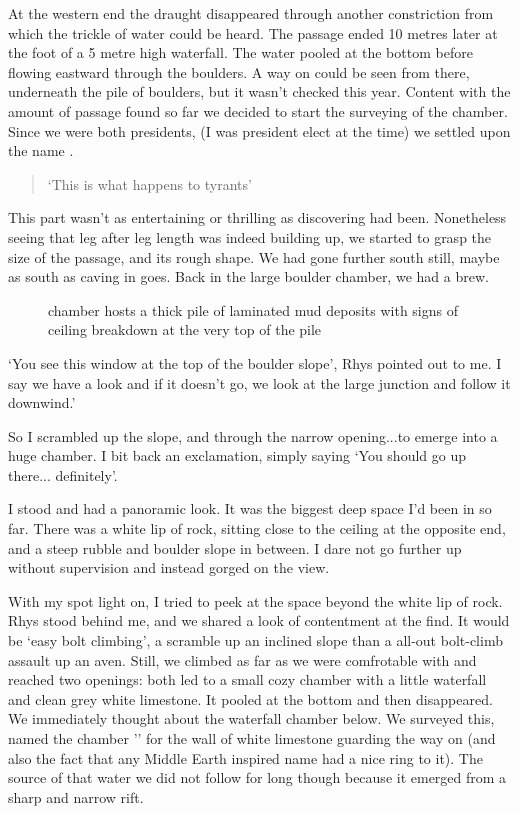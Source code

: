 At the western end the draught disappeared through another constriction from which the trickle of water could be heard. The passage ended 10 metres later at the foot of a 5 metre high waterfall. The water pooled at the bottom before flowing eastward through the boulders. A way on could be seen from there, underneath the pile of boulders, but it wasn't checked this year. Content with the amount of passage found so far we decided to start the surveying of the chamber. Since we were both presidents, (I was president elect at the time) we settled upon the name . 
\begin{quote}`This is what happens to tyrants' \end{quote}





This part wasn't as entertaining or thrilling as discovering had been. Nonetheless seeing that leg after leg length was indeed building up, we started to grasp the size of the passage, and its rough shape. We had gone further south still, maybe as south as caving in  goes. Back in the large boulder chamber, we had a brew.

\begin{figure}[t!]
\checkoddpage \ifoddpage \forcerectofloat \else \forceversofloat \fi
\centering
{}
\caption{\protect{} chamber hosts a thick pile of laminated mud deposits with signs of ceiling breakdown at the very top of the pile }
\label{helmsdeeo}
\end{figure}

`You see this window at the top of the boulder slope', Rhys pointed out to me. I say we have a look and if it doesn't go, we look at the large junction and follow it downwind.' 

So I scrambled up the slope, and through the narrow opening...to emerge into a huge chamber. I bit back an exclamation, simply saying `You should go up there... definitely'. 

I stood and had a panoramic look. It was the biggest deep space I'd been in so far. There was a white lip of rock, sitting close to the ceiling at the opposite end, and a steep rubble and boulder slope in between. I dare not go further up without supervision and instead gorged on the view. 

With my spot light on, I tried to peek at the space beyond the white lip of rock. Rhys stood behind me, and we shared a look of contentment at the find. It would be `easy bolt climbing', a scramble up an inclined slope than a all-out bolt-climb assault up an aven. Still, we climbed as far as we were comfrotable with and reached two openings: both led to a small cozy chamber with a little waterfall and clean grey white limestone. It pooled at the bottom and then disappeared. We immediately thought about the waterfall chamber below. We surveyed this, named the chamber '' for the wall of white limestone guarding the way on (and also the fact that any Middle Earth inspired name had a nice ring to it). The source of that water we did not follow for long though because it emerged from a sharp and narrow rift. 

